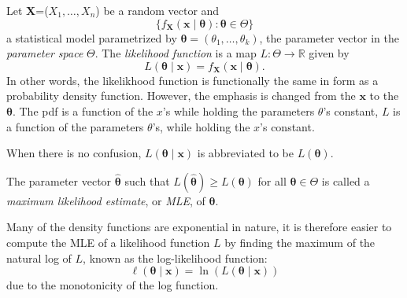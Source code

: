 \documentclass[12pt]{article}
\begin{document}
Let \textbf{X}=($X_1,\ldots,X_n$) be a random vector and $$\lbrace f_{\mathbf{X}}(\boldsymbol{x}\mid\boldsymbol{\theta}) : \boldsymbol{\theta} \in \Theta \rbrace$$ a statistical model parametrized by $\boldsymbol{\theta}=(\theta_1,\ldots,\theta_k)$, the parameter vector in the \emph{parameter space} $\Theta$.  The \emph{likelihood function} is a map $L: \Theta \to \mathbb{R}$ given by $$L(\boldsymbol{\theta}\mid\boldsymbol{x}) =  f_{\mathbf{X}}(\boldsymbol{x}\mid\boldsymbol{\theta}).$$
In other words, the likelikhood function is functionally the same in form as a probability density function.  However, the emphasis is changed from the $\boldsymbol{x}$ to the $\boldsymbol{\theta}$.  The pdf is a function of the $x$'s while holding the parameters $\theta$'s constant, $L$ is a function of the parameters $\theta$'s, while holding the $x$'s constant.

When there is no confusion, $L(\boldsymbol{\theta}\mid\boldsymbol{x})$ is abbreviated to be $L(\boldsymbol{\theta})$.  

The parameter vector $\hat{\boldsymbol{\theta}}$ such that $L(\hat{\boldsymbol{\theta}})\geq L(\boldsymbol{\theta})$ for all $\boldsymbol{\theta}\in\Theta$ is called a \emph{maximum likelihood estimate}, or \emph{MLE}, of $\boldsymbol{\theta}$.

Many of the density functions are exponential in nature, it is therefore easier to compute the MLE of a likelihood 
function $L$ by finding the maximum of the natural log of $L$, known as the log-likelihood function: $$\ell(\boldsymbol{\theta}\mid\boldsymbol{x}) =  \operatorname{ln}(L(\boldsymbol{\theta}\mid\boldsymbol{x}))$$
due to the monotonicity of the log function.
\end{document}
